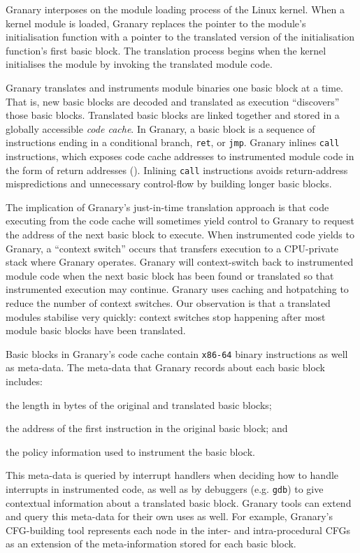 \documentclass{sigplanconf}
\begin{document}
Granary interposes on the module loading process of the Linux kernel. When a kernel module is loaded, Granary replaces the pointer to the module's initialisation function with a pointer to the translated version of the initialisation function's first basic block. The translation process begins when the kernel initialises the module by invoking the translated module code.

Granary translates and instruments module binaries one basic block at a time. That is, new basic blocks are decoded and translated as execution ``discovers'' those basic blocks. Translated basic blocks are linked together and stored in a globally accessible \emph{code cache}. In Granary, a basic block is a sequence of instructions ending in a conditional branch, \texttt{ret}, or \texttt{jmp}. Granary inlines \texttt{call} instructions, which exposes code cache addresses to instrumented module code in the form of return addresses (). Inlining \texttt{call} instructions avoids return-address mispredictions and unnecessary control-flow by building longer basic blocks.

The implication of Granary's just-in-time translation approach is that code executing from the code cache will sometimes yield control to Granary to request the address of the next basic block to execute. When instrumented code yields to Granary, a ``context switch'' occurs that transfers execution to a CPU-private stack where Granary operates. Granary will context-switch back to instrumented module code when the next basic block has been found or translated so that instrumented execution may continue. Granary uses caching and hotpatching to reduce the number of context switches. Our observation is that a translated modules stabilise very quickly: context switches stop happening after most module basic blocks have been translated.

Basic blocks in Granary's code cache contain \texttt{x86-64} binary instructions as well as meta-data. The meta-data that Granary records about each basic block includes: \begin{inparaenum}[i)]
	\item the length in bytes of the original and translated basic blocks;
	\item the address of the first instruction in the original basic block; and
	\item the policy information used to instrument the basic block.
\end{inparaenum} This meta-data is queried by interrupt handlers when deciding how to handle interrupts in instrumented code, as well as by debuggers (e.g. \texttt{gdb}) to give contextual information about a translated basic block. Granary tools can extend and query this meta-data for their own uses as well. For example, Granary's CFG-building tool represents each node in the inter- and intra-procedural CFGs as an extension of the meta-information stored for each basic block.
\end{document}
